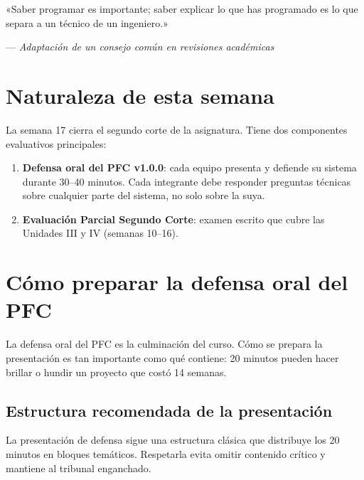\documentclass[11pt,a4paper,openany]{book}
\begin{document}
\epigraph{«Saber programar es importante; saber explicar lo que has
programado es lo que separa a un técnico de un ingeniero.»}{---
\textit{Adaptación de un consejo común en revisiones académicas}}

\section*{Naturaleza de esta semana}
La semana 17 cierra el segundo corte de la asignatura. Tiene dos
componentes evaluativos principales:

\begin{enumerate}
\item \textbf{Defensa oral del PFC v1.0.0}: cada equipo presenta y
defiende su sistema durante 30--40 minutos. Cada integrante debe
responder preguntas técnicas sobre cualquier parte del sistema, no
solo sobre la suya.
\item \textbf{Evaluación Parcial Segundo Corte}: examen escrito que
cubre las Unidades III y IV (semanas 10--16).
\end{enumerate}

\section{Cómo preparar la defensa oral del PFC}

La defensa oral del PFC es la culminación del curso. Cómo
se prepara la presentación es tan importante como qué contiene:
20 minutos pueden hacer brillar o hundir un proyecto que costó 14
semanas.


\subsection{Estructura recomendada de la presentación}

La presentación de defensa sigue una estructura clásica que
distribuye los 20 minutos en bloques temáticos. Respetarla evita
omitir contenido crítico y mantiene al tribunal enganchado.
\end{document}
